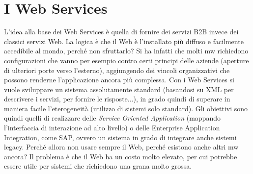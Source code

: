 \section{I Web Services}
L'idea alla base dei Web Services è quella di fornire dei servizi B2B invece dei classici servizi Web. La logica è che
il Web è l'installato più diffuso e facilmente accedibile al mondo, perché non sfruttarlo?
Si ha infatti che molti mw richiedono configurazioni che vanno per esempio contro certi principi delle aziende
(aperture di ulteriori porte verso l'esterno), aggiungendo dei vincoli organizzativi che possono renderne
l'applicazione ancora più complessa.
Con i Web Services si vuole sviluppare un sistema assolutamente standard (basandosi su XML per descrivere i servizi,
per fornire le risposte...), in grado quindi di superare in maniera facile l'eterogeneità (utilizzo di sistemi solo
standard). Gli obiettivi sono quindi quelli di realizzare delle \textit{Service Oriented Application} (mappando
l'interfaccia di interazione ad alto livello) o delle Enterprise Application Integration, come SAP, ovvero un sistema
in grado di integrare anche sistemi legacy.
Perché allora non usare sempre il Web, perché esistono anche altri mw ancora? Il problema è che il Web ha un costo
molto elevato, per cui potrebbe essere utile per sistemi che richiedono una grana molto grossa.
